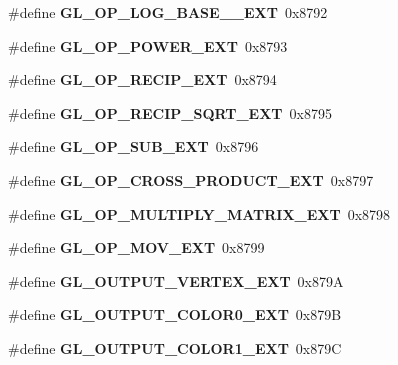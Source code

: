 \begin{DoxyCompactItemize}
\item 
\#define {\bfseries G\+L\+\_\+\+O\+P\+\_\+\+L\+O\+G\+\_\+\+B\+A\+S\+E\+\_\+\_\+\+E\+X\+T}~0x8792\label{_s_d_l__opengl_8h_a4d3cbad14eabbd008f372198dde9f34b}

\item 
\#define {\bfseries G\+L\+\_\+\+O\+P\+\_\+\+P\+O\+W\+E\+R\+\_\+\+E\+X\+T}~0x8793\label{_s_d_l__opengl_8h_a5e41c6993fe09779d4c49251f6adf2eb}

\item 
\#define {\bfseries G\+L\+\_\+\+O\+P\+\_\+\+R\+E\+C\+I\+P\+\_\+\+E\+X\+T}~0x8794\label{_s_d_l__opengl_8h_aadd6e35479ae74aa5f158ff72df46819}

\item 
\#define {\bfseries G\+L\+\_\+\+O\+P\+\_\+\+R\+E\+C\+I\+P\+\_\+\+S\+Q\+R\+T\+\_\+\+E\+X\+T}~0x8795\label{_s_d_l__opengl_8h_a1837774d916cc21a30d830800f9fc7d4}

\item 
\#define {\bfseries G\+L\+\_\+\+O\+P\+\_\+\+S\+U\+B\+\_\+\+E\+X\+T}~0x8796\label{_s_d_l__opengl_8h_a258c32c36fc6781c49e6b3702b330d97}

\item 
\#define {\bfseries G\+L\+\_\+\+O\+P\+\_\+\+C\+R\+O\+S\+S\+\_\+\+P\+R\+O\+D\+U\+C\+T\+\_\+\+E\+X\+T}~0x8797\label{_s_d_l__opengl_8h_a2919987fe6b7397e82734d6b370c5195}

\item 
\#define {\bfseries G\+L\+\_\+\+O\+P\+\_\+\+M\+U\+L\+T\+I\+P\+L\+Y\+\_\+\+M\+A\+T\+R\+I\+X\+\_\+\+E\+X\+T}~0x8798\label{_s_d_l__opengl_8h_a5382030c00e05ee3a1af8fb9b1cb2d65}

\item 
\#define {\bfseries G\+L\+\_\+\+O\+P\+\_\+\+M\+O\+V\+\_\+\+E\+X\+T}~0x8799\label{_s_d_l__opengl_8h_a14f7f1b96108f94bb5bb5f993c3531be}

\item 
\#define {\bfseries G\+L\+\_\+\+O\+U\+T\+P\+U\+T\+\_\+\+V\+E\+R\+T\+E\+X\+\_\+\+E\+X\+T}~0x879\+A\label{_s_d_l__opengl_8h_a615f875bdd94840f399047277076ae25}

\item 
\#define {\bfseries G\+L\+\_\+\+O\+U\+T\+P\+U\+T\+\_\+\+C\+O\+L\+O\+R0\+\_\+\+E\+X\+T}~0x879\+B\label{_s_d_l__opengl_8h_a6658254a5748548047bbfa77e81da14c}

\item 
\#define {\bfseries G\+L\+\_\+\+O\+U\+T\+P\+U\+T\+\_\+\+C\+O\+L\+O\+R1\+\_\+\+E\+X\+T}~0x879\+C\label{_s_d_l__opengl_8h_a9e0b24e6362e65333320a752b0699e24}


\end{DoxyCompactItemize}
